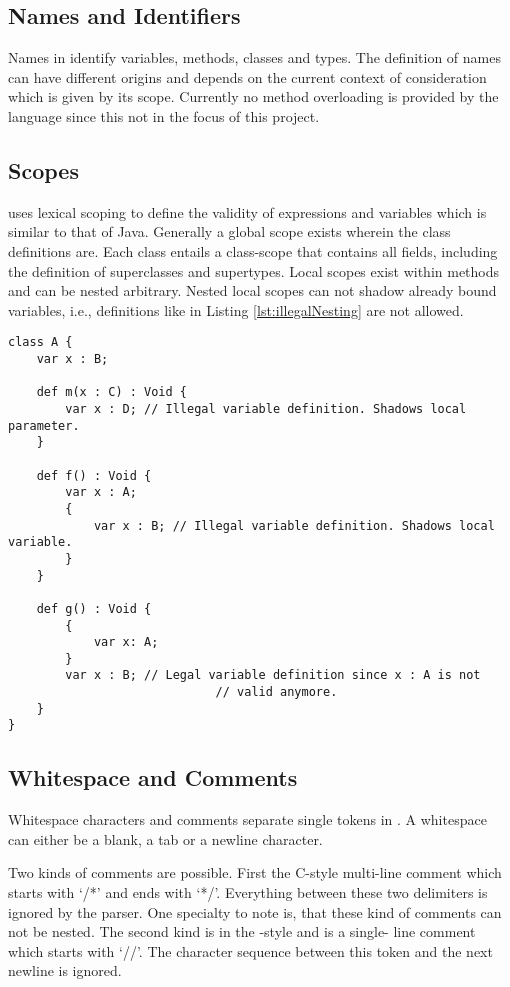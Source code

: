 \subsection{Names and Identifiers}
Names in \ooplss identify variables, methods, classes and types. The
definition of names can have different origins and depends on the current
context of consideration which is given by its scope. Currently no method
overloading is provided by the language since this not in the focus of this
project.

\subsection{Scopes}
\ooplss uses lexical scoping to define the validity of expressions and
variables which is similar to that of Java. Generally a global
scope exists wherein the class definitions are. Each class entails a class-scope
that contains all fields, including the definition of superclasses and
supertypes. Local scopes exist within methods and can be nested arbitrary.
Nested local scopes can not shadow already bound variables, i.e., definitions
like in Listing \ref{lst:illegalNesting} are not allowed.

\begin{lstlisting}[float=ht,language=ooplss,caption=Variable definition in local scope,label=lst:illegalNesting]
class A {
	var x : B;

	def m(x : C) : Void {
		var x : D; // Illegal variable definition. Shadows local parameter.
	}

	def f() : Void {
		var x : A;
		{
			var x : B; // Illegal variable definition. Shadows local variable.
		}
	}

	def g() : Void {
		{
			var x: A;
		}
		var x : B; // Legal variable definition since x : A is not
							 // valid anymore.
	}
}
\end{lstlisting}
\subsection{Whitespace and Comments}
Whitespace characters and comments separate single tokens in \ooplss. A
whitespace can either be a blank, a tab or a newline character.

Two kinds of comments are possible. First the C-style multi-line comment which
starts with `/*' and ends with `*/'. Everything between these two delimiters
is ignored by the parser. One specialty to note is, that these kind of comments
can not be nested.
The second kind is in the \cpp-style and is a single- line comment which starts
with `//'. The character sequence between this token and the next newline
is ignored.


